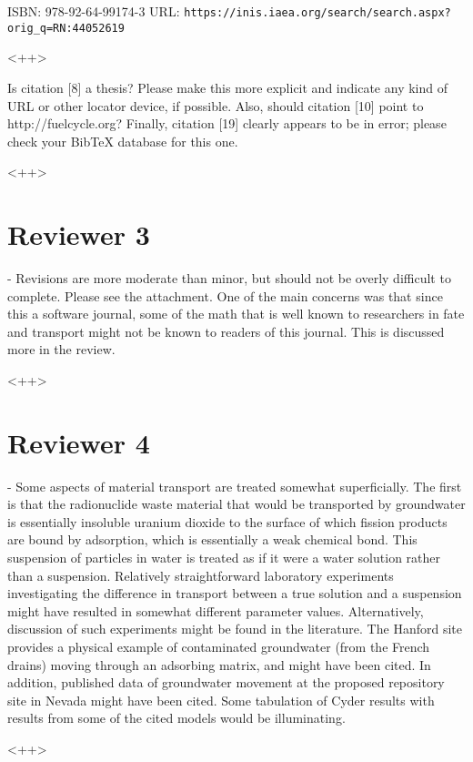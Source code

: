\documentclass[answers,12pt]{exam}
\begin{document}
\begin{questions}
ISBN: 978-92-64-99174-3
URL: \verb|https://inis.iaea.org/search/search.aspx?orig_q=RN:44052619|
\begin{solution}
<++>
\end{solution}

\question Is citation [8] a thesis? Please make this more explicit and indicate any kind of URL or other locator device, if possible. Also, should citation [10] point to http://fuelcycle.org? Finally, citation [19] clearly appears to be in error; please check your BibTeX database for this one.
\begin{solution}
<++>
\end{solution}

\section*{Reviewer 3}

\question   - Revisions are more moderate than minor, but should not be overly difficult
to complete. Please see the attachment. One of the main concerns was that since
this a software journal, some of the math that is well known to researchers in
fate and transport might not be known to readers of this journal. This is
discussed more in the review.
\begin{solution}
<++>
\end{solution}

\section*{Reviewer 4}

\question   - Some aspects of material transport are treated somewhat superficially. The
first is that the radionuclide waste material that would be transported by
groundwater is essentially insoluble uranium dioxide to the surface of which
fission products are bound by adsorption, which is essentially a weak chemical
bond.  This suspension of particles in water is treated as if it were a water
solution rather than a suspension.  Relatively straightforward laboratory
experiments investigating the difference in transport between a true solution
and a suspension might have resulted in somewhat different parameter values.
Alternatively, discussion of such experiments might be found in the literature.
The Hanford site provides a physical example of contaminated groundwater (from
the French drains) moving through an adsorbing matrix, and might have been
cited. In addition, published data of groundwater movement at the proposed
repository site in Nevada might have been cited.  Some tabulation of Cyder
results with results from some of the cited models would be illuminating. 
\begin{solution}
<++>
\end{solution}

\end{questions}
  
\end{document}
